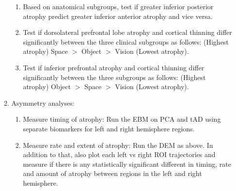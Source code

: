 \begin{enumerate}
\begin{enumerate}
  \begin{enumerate}
   \item Based on anatomical subgroups, test if greater inferior posterior atrophy predict greater inferior anterior atrophy and vice versa.
   \item Test if dorsolateral prefrontal lobe atrophy and cortical thinning differ significantly between the three clinical subgroups as follows: (Highest atrophy) Space $>$ Object $>$ Vision (Lowest atrophy). 
   \item Test if inferior prefrontal atrophy and cortical thinning differ significantly between the three subgroups as follows: (Highest atrophy) Object $>$ Space $>$ Vision (Lowest atrophy). 
  \end{enumerate}
  \item Asymmetry analyses: 
  \begin{enumerate}
   \item Measure timing of atrophy: Run the EBM on PCA and tAD using separate biomarkers for left and right hemisphere regions.
   \item Measure rate and extent of atrophy: Run the DEM as above. In addition to that, also plot each left vs right ROI trajectories and measure if there is any statistically significant different in timing, rate and amount of atrophy between regions in the left and right hemisphere. 
  \end{enumerate}
 \end{enumerate}
\end{enumerate}



